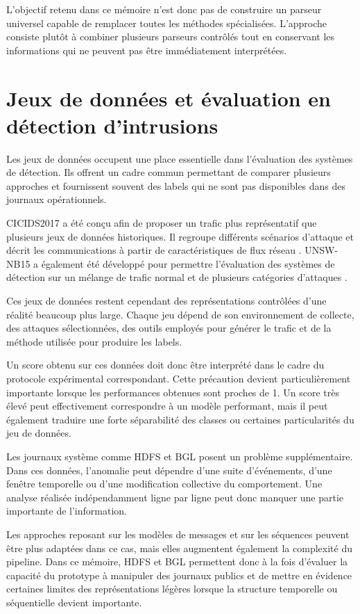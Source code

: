 L'objectif retenu dans ce mémoire n'est donc pas de construire un parseur universel capable de remplacer toutes les méthodes spécialisées. L'approche consiste plutôt à combiner plusieurs parseurs contrôlés tout en conservant les informations qui ne peuvent pas être immédiatement interprétées.

\section{Jeux de données et évaluation en détection d'intrusions}

Les jeux de données occupent une place essentielle dans l'évaluation des systèmes de détection. Ils offrent un cadre commun permettant de comparer plusieurs approches et fournissent souvent des labels qui ne sont pas disponibles dans des journaux opérationnels.

CICIDS2017 a été conçu afin de proposer un trafic plus représentatif que plusieurs jeux de données historiques. Il regroupe différents scénarios d'attaque et décrit les communications à partir de caractéristiques de flux réseau \cite{sharafaldin2018cicids}. UNSW-NB15 a également été développé pour permettre l'évaluation des systèmes de détection sur un mélange de trafic normal et de plusieurs catégories d'attaques \cite{moustafa2015unsw}.

Ces jeux de données restent cependant des représentations contrôlées d'une réalité beaucoup plus large. Chaque jeu dépend de son environnement de collecte, des attaques sélectionnées, des outils employés pour générer le trafic et de la méthode utilisée pour produire les labels.

Un score obtenu sur ces données doit donc être interprété dans le cadre du protocole expérimental correspondant. Cette précaution devient particulièrement importante lorsque les performances obtenues sont proches de 1. Un score très élevé peut effectivement correspondre à un modèle performant, mais il peut également traduire une forte séparabilité des classes ou certaines particularités du jeu de données.

Les journaux système comme HDFS et BGL posent un problème supplémentaire. Dans ces données, l'anomalie peut dépendre d'une suite d'événements, d'une fenêtre temporelle ou d'une modification collective du comportement. Une analyse réalisée indépendamment ligne par ligne peut donc manquer une partie importante de l'information.

Les approches reposant sur les modèles de messages et sur les séquences peuvent être plus adaptées dans ce cas, mais elles augmentent également la complexité du pipeline. Dans ce mémoire, HDFS et BGL permettent donc à la fois d'évaluer la capacité du prototype à manipuler des journaux publics et de mettre en évidence certaines limites des représentations légères lorsque la structure temporelle ou séquentielle devient importante.

